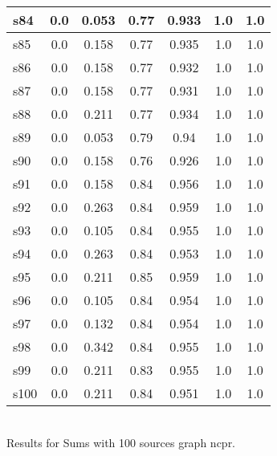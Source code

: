 \documentclass{article}
\begin{document}
\begin{tabular}{|l|c|c|c|c|c|c|}
\hline
s84 &0.0 & 0.053 & 0.77 & 0.933 & 1.0 & 1.0\\
\hline
s85 &0.0 & 0.158 & 0.77 & 0.935 & 1.0 & 1.0\\
\hline
s86 &0.0 & 0.158 & 0.77 & 0.932 & 1.0 & 1.0\\
\hline
s87 &0.0 & 0.158 & 0.77 & 0.931 & 1.0 & 1.0\\
\hline
s88 &0.0 & 0.211 & 0.77 & 0.934 & 1.0 & 1.0\\
\hline
s89 &0.0 & 0.053 & 0.79 & 0.94 & 1.0 & 1.0\\
\hline
s90 &0.0 & 0.158 & 0.76 & 0.926 & 1.0 & 1.0\\
\hline
s91 &0.0 & 0.158 & 0.84 & 0.956 & 1.0 & 1.0\\
\hline
s92 &0.0 & 0.263 & 0.84 & 0.959 & 1.0 & 1.0\\
\hline
s93 &0.0 & 0.105 & 0.84 & 0.955 & 1.0 & 1.0\\
\hline
s94 &0.0 & 0.263 & 0.84 & 0.953 & 1.0 & 1.0\\
\hline
s95 &0.0 & 0.211 & 0.85 & 0.959 & 1.0 & 1.0\\
\hline
s96 &0.0 & 0.105 & 0.84 & 0.954 & 1.0 & 1.0\\
\hline
s97 &0.0 & 0.132 & 0.84 & 0.954 & 1.0 & 1.0\\
\hline
s98 &0.0 & 0.342 & 0.84 & 0.955 & 1.0 & 1.0\\
\hline
s99 &0.0 & 0.211 & 0.83 & 0.955 & 1.0 & 1.0\\
\hline
s100 &0.0 & 0.211 & 0.84 & 0.951 & 1.0 & 1.0\\
\hline
\end{tabular}\\

\noindent Results for Sums with 100 sources graph ncpr.
\end{document}
